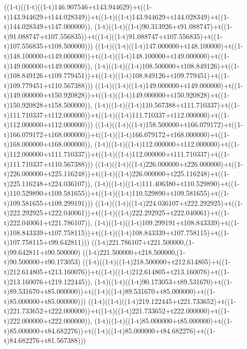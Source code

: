((1-t)((1-t)((1-t)146.907546+t143.944629)+t((1-t)143.944629+t144.028349))+t((1-t)((1-t)143.944629+t144.028349)+t((1-t)144.028349+t147.000000)),                                     (1-t)((1-t)((1-t)90.313926+t91.088747)+t((1-t)91.088747+t107.556835))+t((1-t)((1-t)91.088747+t107.556835)+t((1-t)107.556835+t108.500000)))
((1-t)((1-t)((1-t)147.000000+t148.100000)+t((1-t)148.100000+t149.000000))+t((1-t)((1-t)148.100000+t149.000000)+t((1-t)149.000000+t149.000000)),                                     (1-t)((1-t)((1-t)108.500000+t108.849126)+t((1-t)108.849126+t109.779451))+t((1-t)((1-t)108.849126+t109.779451)+t((1-t)109.779451+t110.567388)))
((1-t)((1-t)((1-t)149.000000+t149.000000)+t((1-t)149.000000+t150.920828))+t((1-t)((1-t)149.000000+t150.920828)+t((1-t)150.920828+t158.500000)),                                     (1-t)((1-t)((1-t)110.567388+t111.710337)+t((1-t)111.710337+t112.000000))+t((1-t)((1-t)111.710337+t112.000000)+t((1-t)112.000000+t112.000000)))
((1-t)((1-t)((1-t)158.500000+t166.079172)+t((1-t)166.079172+t168.000000))+t((1-t)((1-t)166.079172+t168.000000)+t((1-t)168.000000+t168.000000)),                                     (1-t)((1-t)((1-t)112.000000+t112.000000)+t((1-t)112.000000+t111.710337))+t((1-t)((1-t)112.000000+t111.710337)+t((1-t)111.710337+t110.567388)))
((1-t)((1-t)((1-t)226.000000+t226.000000)+t((1-t)226.000000+t225.116248))+t((1-t)((1-t)226.000000+t225.116248)+t((1-t)225.116248+t224.036107)),                                     (1-t)((1-t)((1-t)111.406380+t110.529890)+t((1-t)110.529890+t109.581655))+t((1-t)((1-t)110.529890+t109.581655)+t((1-t)109.581655+t109.299191)))
((1-t)((1-t)((1-t)224.036107+t222.292925)+t((1-t)222.292925+t222.040061))+t((1-t)((1-t)222.292925+t222.040061)+t((1-t)222.040061+t221.786107)),                                     (1-t)((1-t)((1-t)109.299191+t108.843339)+t((1-t)108.843339+t107.758115))+t((1-t)((1-t)108.843339+t107.758115)+t((1-t)107.758115+t99.642811)))
((1-t)221.786107+t221.500000,(1-t)99.642811+t90.500000)
((1-t)221.500000+t218.500000,(1-t)90.500000+t90.173053)
((1-t)((1-t)((1-t)218.500000+t212.614805)+t((1-t)212.614805+t213.160076))+t((1-t)((1-t)212.614805+t213.160076)+t((1-t)213.160076+t219.122445)),                                     (1-t)((1-t)((1-t)90.173053+t89.531670)+t((1-t)89.531670+t85.000000))+t((1-t)((1-t)89.531670+t85.000000)+t((1-t)85.000000+t85.000000)))
((1-t)((1-t)((1-t)219.122445+t221.733652)+t((1-t)221.733652+t222.000000))+t((1-t)((1-t)221.733652+t222.000000)+t((1-t)222.000000+t222.000000)),                                     (1-t)((1-t)((1-t)85.000000+t85.000000)+t((1-t)85.000000+t84.682276))+t((1-t)((1-t)85.000000+t84.682276)+t((1-t)84.682276+t81.567388)))
